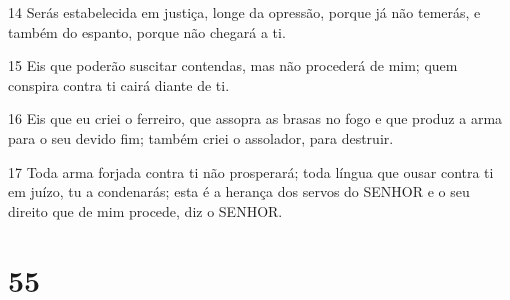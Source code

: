 \par 14 Serás estabelecida em justiça, longe da opressão, porque já não temerás, e também do espanto, porque não chegará a ti.
\par 15 Eis que poderão suscitar contendas, mas não procederá de mim; quem conspira contra ti cairá diante de ti.
\par 16 Eis que eu criei o ferreiro, que assopra as brasas no fogo e que produz a arma para o seu devido fim; também criei o assolador, para destruir.
\par 17 Toda arma forjada contra ti não prosperará; toda língua que ousar contra ti em juízo, tu a condenarás; esta é a herança dos servos do SENHOR e o seu direito que de mim procede, diz o SENHOR.

\chapter{55}

